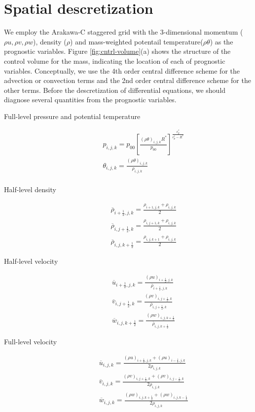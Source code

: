 \section{Spatial descretization}
We employ the Arakawa-C staggered grid with the 3-dimensional momentum 
($\rho u, \rho v, \rho w$), density ($\rho$) and mass-weighted potentail temperature($\rho \theta$)
as the prognostic variables.
Figure \ref{fig:cntrl-volume}(a) shows the structure of the control volume for the mass,
indicating the location of each of prognostic variables.
Conceptually, we use the 4th order central difference scheme 
for the advection or convection terms and
the 2nd order central difference scheme for the other terms.
Before the descretization of differential equations,
we should diagnose several quantities from the prognostic variables.
\begin{description}
\item[Full-level pressure and potential temperature]
\begin{eqnarray}
&&p_{i,j,k}=p_{00}\left[\frac{(\rho \theta)_{i,j,k} R^*}{p_{00}} \right]^{\frac{c_{p}^*}{c_{p}^*- R^*}}\\
&&\theta_{i,j,k} = \frac{(\rho \theta)_{i,j,k}}{\rho_{i,j,k}} \label{eq:theta full} \\
\end{eqnarray}
\item[Half-level density]
\begin{eqnarray}
&&  \overline{\rho}_{i+\frac{1}{2},j,k} = \frac{\rho_{i+1,j,k}+\rho_{i,j,k}}{2} \label{eq:rho half i} \\
&&  \overline{\rho}_{i,j+\frac{1}{2},k} = \frac{\rho_{i,j+1,k}+\rho_{i,j,k}}{2} \label{eq:rho half j} \\
&&  \overline{\rho}_{i,j,k+\frac{1}{2}} = \frac{\rho_{i,j,k+1}+\rho_{i,j,k}}{2} \label{eq:rho half k}
\end{eqnarray}
\item[Half-level velocity]
\begin{eqnarray}
&&  \overline{u}_{i+\frac{1}{2},j,k} = \frac{(\rho u)_{i+\frac{1}{2},j,k}}{\overline{\rho}_{i+\frac{1}{2},j,k}}\\
&&  \overline{v}_{i,j+\frac{1}{2},k} = \frac{(\rho v)_{i,j+\frac{1}{2},k}}{\overline{\rho}_{i,j+\frac{1}{2},k}}\\
&&  \overline{w}_{i,j,k+\frac{1}{2}} = \frac{(\rho w)_{i,j,k+\frac{1}{2}}}{\overline{\rho}_{i,j,k+\frac{1}{2}}}
\end{eqnarray}
\item[Full-level velocity]
\begin{eqnarray}
&&  \overline{u}_{i,j,k} = \frac{(\rho u)_{i+\frac{1}{2},j,k}+(\rho u)_{i-\frac{1}{2},j,k}}{2\rho_{i,j,k}} \label{eq:u full} \\
&&  \overline{v}_{i,j,k} = \frac{(\rho v)_{i,j+\frac{1}{2},k}+(\rho v)_{i,j-\frac{1}{2},k}}{2\rho_{i,j,k}} \label{eq:v full} \\
&&  \overline{w}_{i,j,k} = \frac{(\rho w)_{i,j,k+\frac{1}{2}}+(\rho w)_{i,j,k-\frac{1}{2}}}{2\rho_{i,j,k}} \label{eq:w full}
\end{eqnarray}
\end{description}




